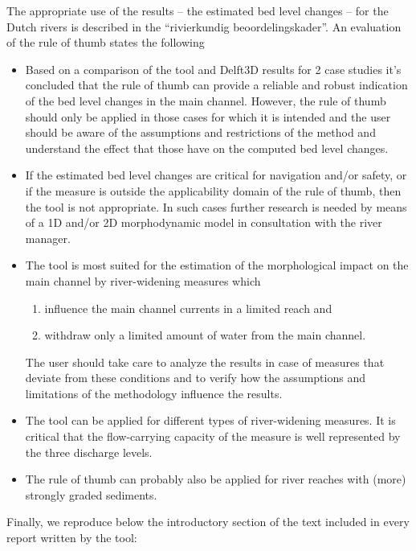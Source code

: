 The appropriate use of the results -- the estimated bed level changes -- for the Dutch rivers is described in the ``rivierkundig beoordelingskader''.
An evaluation of the rule of thumb \citep{Paarlberg2009} states the following

\begin{itemize}

\item Based on a comparison of the tool and Delft3D results for 2 case studies it's concluded that the rule of thumb can provide a reliable and robust indication of the bed level changes in the main channel.
However, the rule of thumb should only be applied in those cases for which it is intended and the user should be aware of the assumptions and restrictions of the method and understand the effect that those have on the computed bed level changes.

\item If the estimated bed level changes are critical for navigation and/or safety, or if the measure is outside the applicability domain of the rule of thumb, then the tool is not appropriate.
In such cases further research is needed by means of a 1D and/or 2D morphodynamic model in consultation with the river manager.

\item The tool is most suited for the estimation of the morphological impact on the main channel by river-widening measures which
\begin{enumerate}
\item influence the main channel currents in a limited reach and
\item withdraw only a limited amount of water from the main channel.
\end{enumerate}
The user should take care to analyze the results in case of measures that deviate from these conditions and to verify how the assumptions and limitations of the methodology influence the results.

\item The tool can be applied for different types of river-widening measures.
It is critical that the flow-carrying capacity of the measure is well represented by the three discharge levels.

\item The rule of thumb can probably also be applied for river reaches with (more) strongly graded sediments.
\end{itemize}

Finally, we reproduce below the introductory section of the text included in every report written by the tool:

